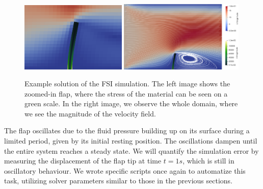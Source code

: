 \documentclass[
  english,        %
  font=times,     %
  onecolumn,      %
]{tumarticle}
\begin{document}
\begin{figure}[!ht]
    \centering
    \includegraphics[width=0.45\textwidth]{resources/FSI_small.png}
    \includegraphics[width=0.53\textwidth]{resources/FSI_big.png}
    \caption{Example solution of the FSI simulation. The left image shows the zoomed-in flap, where the stress of the material can be seen on a green scale. In the right image, we observe the whole domain, where we see the magnitude of the velocity field.}
    \label{fig:FSI}
\end{figure}

The flap oscillates due to the fluid pressure building up on its surface during a limited period, given by its initial resting position. The oscillations dampen until the entire system reaches a steady state. We will quantify the simulation error by measuring the displacement of the flap tip at time $t=1s$, which is still in oscillatory behaviour. We wrote specific scripts once again to automatize this task, utilizing solver parameters similar to those in the previous sections. 
\end{document}
